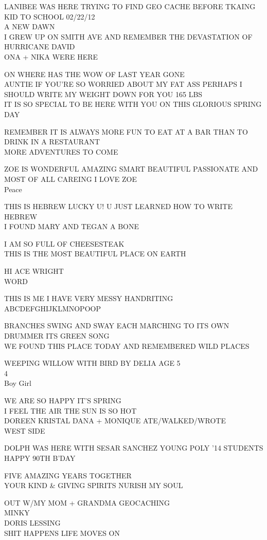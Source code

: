 \documentclass[10pt,letterpaper]{article}
\begin{document}
LANIBEE WAS HERE TRYING TO FIND GEO CACHE BEFORE TKAING KID TO SCHOOL 02/22/12\\
A NEW DAWN\\
I GREW UP ON SMITH AVE AND REMEMBER THE DEVASTATION OF HURRICANE DAVID\\
ONA + NIKA WERE HERE

ON WHERE HAS THE WOW OF LAST YEAR GONE\\
AUNTIE IF YOU'RE SO WORRIED ABOUT MY FAT ASS PERHAPS I SHOULD WRITE MY WEIGHT DOWN  FOR YOU 165 LBS\\
IT IS SO SPECIAL TO BE HERE WITH YOU ON THIS GLORIOUS SPRING DAY

REMEMBER IT IS ALWAYS MORE FUN TO EAT AT A BAR THAN TO DRINK IN A RESTAURANT\\
MORE ADVENTURES TO COME

ZOE IS WONDERFUL AMAZING SMART BEAUTIFUL PASSIONATE AND MOST OF ALL CAREING I LOVE ZOE\\
Peace

THIS IS HEBREW LUCKY U! U JUST LEARNED HOW TO WRITE HEBREW\\
I FOUND MARY AND TEGAN A BONE

I AM SO FULL OF CHEESESTEAK\\
THIS IS THE MOST BEAUTIFUL PLACE ON EARTH

HI ACE WRIGHT\\
WORD

THIS IS ME I HAVE VERY MESSY HANDRITING\\
ABCDEFGHIJKLMNOPOOP

BRANCHES SWING AND SWAY EACH MARCHING TO ITS OWN DRUMMER ITS GREEN SONG\\
WE FOUND THIS PLACE TODAY AND REMEMBERED WILD PLACES

WEEPING WILLOW WITH BIRD BY DELIA AGE 5\\
4\\
Boy Girl

WE ARE SO HAPPY IT'S SPRING\\
I FEEL THE AIR THE SUN IS SO HOT\\
DOREEN KRISTAL DANA + MONIQUE ATE/WALKED/WROTE\\
WEST SIDE

DOLPH WAS HERE WITH SESAR SANCHEZ YOUNG POLY '14 STUDENTS\\
HAPPY 90TH B'DAY

FIVE AMAZING YEARS TOGETHER\\
YOUR KIND \& GIVING SPIRITS NURISH MY SOUL

OUT W/MY MOM + GRANDMA GEOCACHING\\
MINKY\\
DORIS LESSING\\
SHIT HAPPENS LIFE MOVES ON
\end{document}
